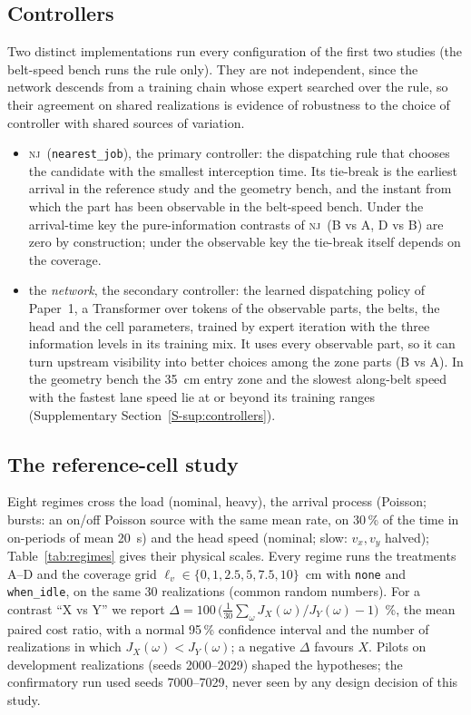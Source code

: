 \documentclass[11pt,a4paper]{article}
\newcommand{\nj}{\textsc{nj}}
\newcommand{\lv}{\ell_{v}}
\newcommand{\supsec}[1]{Supplementary Section~\ref{S-#1}}
\begin{document}
\subsection{Controllers}
Two distinct implementations run every configuration of the first two studies (the
belt-speed bench runs the rule only). They are not independent, since the network descends
from a training chain whose expert searched over the rule, so their agreement on shared
realizations is evidence of robustness to the choice of controller with shared sources of
variation.
\begin{itemize}[nosep]
\item \nj\ (\texttt{nearest\_job}), the primary controller: the dispatching rule that
  chooses the candidate with the smallest interception time. Its tie-break is the earliest
  arrival in the reference study and the geometry bench, and the instant from which the
  part has been observable in the belt-speed bench. Under the arrival-time key the
  pure-information contrasts of \nj\ (B vs A, D vs B) are zero by construction; under the
  observable key the tie-break itself depends on the coverage.
\item the \emph{network}, the secondary controller: the learned dispatching policy of
  Paper~1, a Transformer over tokens of the observable parts, the belts, the head and the
  cell parameters, trained by expert iteration with the three information levels in its
  training mix. It uses every observable part, so it can turn upstream visibility into
  better choices among the zone parts (B vs A). In the geometry bench the 35~cm entry zone and the slowest
  along-belt speed with the fastest lane speed lie at or beyond its training ranges (\supsec{sup:controllers}).
\end{itemize}

\subsection{The reference-cell study}\label{sec:refdesign}
Eight regimes cross the load (nominal, heavy), the arrival process (Poisson; bursts: an
on/off Poisson source with the same mean rate, on 30\,\% of the time in on-periods of mean
20~s) and the head speed (nominal; slow: $v_x,v_y$ halved); Table~\ref{tab:regimes} gives
their physical scales. Every regime runs the treatments A--D and the coverage grid
$\lv\in\{0,1,2.5,5,7.5,10\}$~cm with \texttt{none} and \texttt{when\_idle}, on the same 30
realizations (common random numbers). For a contrast ``X vs Y'' we report
$\Delta=100\,\bigl(\frac{1}{30}\sum_{\omega}J_X(\omega)/J_Y(\omega)-1\bigr)$~\%, the mean
paired cost ratio, with a normal 95\,\% confidence interval and the number of realizations
in which $J_X(\omega)<J_Y(\omega)$; a negative $\Delta$ favours $X$. Pilots on development
realizations (seeds 2000--2029) shaped the hypotheses; the confirmatory run used seeds
7000--7029, never seen by any design decision of this study.
\end{document}
